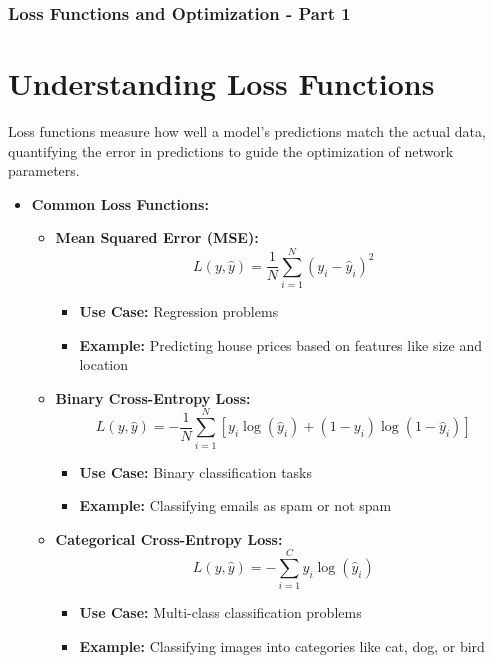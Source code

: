 \documentclass[aspectratio=169]{beamer}
\begin{document}
\begin{frame}[fragile]
    \frametitle{Loss Functions and Optimization - Part 1}

    \section{Understanding Loss Functions}
    Loss functions measure how well a model's predictions match the actual data, quantifying the error in predictions to guide the optimization of network parameters.
    
    \begin{itemize}
        \item \textbf{Common Loss Functions:}
        \begin{itemize}
            \item \textbf{Mean Squared Error (MSE):} 
            \begin{equation}
            L(y, \hat{y}) = \frac{1}{N} \sum_{i=1}^N (y_i - \hat{y}_i)^2 
            \end{equation}
            \begin{itemize}
                \item \textbf{Use Case:} Regression problems
                \item \textbf{Example:} Predicting house prices based on features like size and location
            \end{itemize}
        
            \item \textbf{Binary Cross-Entropy Loss:}
            \begin{equation}
            L(y, \hat{y}) = -\frac{1}{N} \sum_{i=1}^N \left[y_i \log(\hat{y}_i) + (1-y_i) \log(1-\hat{y}_i)\right]
            \end{equation}
            \begin{itemize}
                \item \textbf{Use Case:} Binary classification tasks
                \item \textbf{Example:} Classifying emails as spam or not spam
            \end{itemize}
            
            \item \textbf{Categorical Cross-Entropy Loss:}
            \begin{equation}
            L(y, \hat{y}) = -\sum_{i=1}^C y_i \log(\hat{y}_i)
            \end{equation}
            \begin{itemize}
                \item \textbf{Use Case:} Multi-class classification problems
                \item \textbf{Example:} Classifying images into categories like cat, dog, or bird
            \end{itemize}
        \end{itemize}
    \end{itemize}


\end{frame}
\end{document}
